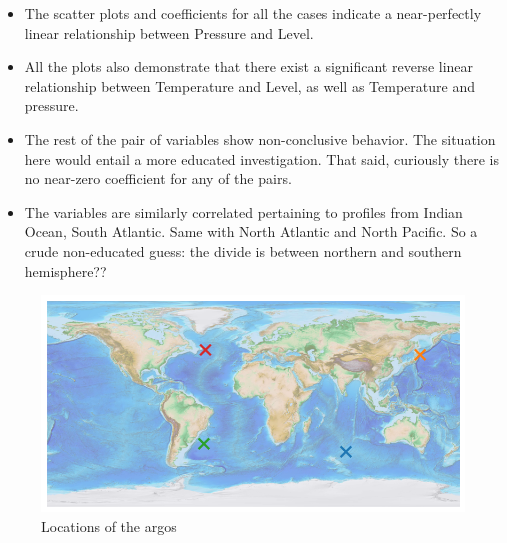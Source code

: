 \documentclass[12pt]{article}
\begin{document}
    \begin{itemize}
        \item The scatter plots and coefficients for all the cases 
        indicate a near-perfectly
        linear relationship between Pressure and Level. 
        \item All the plots also demonstrate that there exist a 
        significant reverse linear relationship between Temperature 
        and Level,
        as well as Temperature and pressure.
        \item The rest of the pair of variables show non-conclusive 
        behavior. The situation here would entail a more educated 
        investigation. That said, curiously there is no near-zero 
        coefficient for any of the pairs.
        \item The variables are similarly correlated pertaining to 
        profiles from Indian Ocean, South Atlantic. Same with North Atlantic
        and North Pacific. So a crude non-educated guess: the divide 
        is between northern and southern hemisphere??
    \end{itemize}

    \begin{figure}
        \centering
        \includegraphics[scale=0.7]{map_of_locations.png}
        \caption{Locations of the argos}
        \label{map}
        \end{figure}
    
\end{document}
